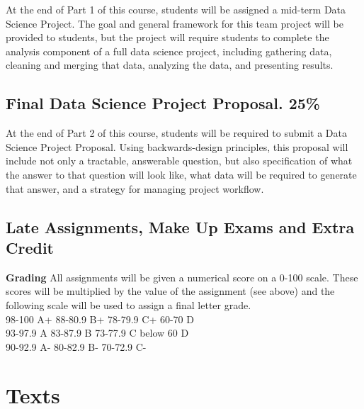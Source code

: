 \documentclass[12pt]{article}
\begin{document}
At the end of Part 1 of this course, students will be assigned a mid-term Data Science Project. The goal and general framework for this team project will be provided to students, but the project will require students to complete the analysis component of a full data science project, including gathering data, cleaning and merging that data, analyzing the data, and presenting results.

\subsection{Final Data Science Project Proposal. 25\%}

At the end of Part 2 of this course, students will be required to submit a Data Science Project Proposal. Using backwards-design principles, this proposal will include not only a tractable, answerable question, but also specification of what the answer to that question will look like, what data will be required to generate that answer, and a strategy for managing project workflow.

\subsection{Late Assignments, Make Up Exams and Extra Credit}


\textbf{Grading}
All assignments will be given a numerical score on a 0-100 scale.  These scores will be multiplied by the value of the assignment (see above) and the following scale will be used to assign a final letter grade.  \\

\hspace*{.2in} 98-100 A+ 	\hspace*{.6in}  88-80.9 B+  	\hspace*{.57in} 78-79.9 C+  		\hspace*{.44in} 60-70 D  	\\
\hspace*{.2in} 93-97.9 A	\hspace*{.68in} 83-87.9 B  	\hspace*{.695in} 73-77.9 C		\hspace*{.57in} below 60 D\\
\hspace*{.2in} 90-92.9 A- 	\hspace*{.63in} 	80-82.9 B- 	\hspace*{.64in} 70-72.9 C-	\\

\section{Texts}
\end{document}

